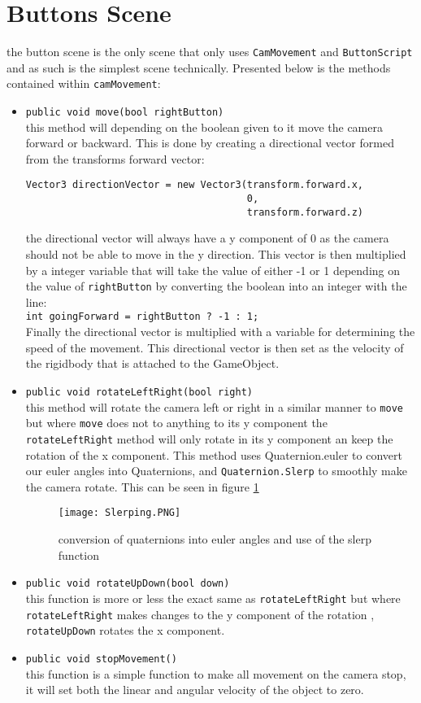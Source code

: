 \section{Buttons Scene}
the button scene is the only scene that only uses  {\tt CamMovement} and {\tt ButtonScript} and as such is the simplest scene technically. Presented below is  the methods contained within {\tt camMovement}: 
\begin{itemize}
\item {\tt public void move(bool rightButton)}\\
this method will depending on the boolean given to it move the camera forward or backward. This is done by creating a directional vector formed from the transforms forward vector:
\begin{verbatim}
Vector3 directionVector = new Vector3(transform.forward.x, 
                                      0,
                                      transform.forward.z)
\end{verbatim}
the directional vector will always have a y component of 0 as the camera should not be able to move in the y direction. This vector is then multiplied by a integer variable that will take the value of either -1 or 1 depending on the value of {\tt rightButton} by converting the boolean into an integer with the line:\\
{\tt int goingForward = rightButton ? -1 : 1;}\\
Finally the directional vector is multiplied with a variable for determining the speed of the movement. This directional vector is then set as the velocity of the rigidbody that is attached to the GameObject. 

\item {\tt public void rotateLeftRight(bool right)}\\
this method will rotate the camera left or right in a similar manner to {\tt move} but where {\tt move} does not to anything to its y component the {\tt rotateLeftRight} method will only rotate in its y component an keep the rotation of the x component. This method uses {Quaternion.euler } to convert our euler angles into Quaternions, and {\tt Quaternion.Slerp} to smoothly make the camera rotate. This can be seen in figure \ref{Slerping} 
\begin{figure}[H]
\centering
\texttt{[image: Slerping.PNG]}
\caption{conversion of quaternions into euler angles and use of the slerp function}
\label{Slerping}
\end{figure}
\item {\tt public void rotateUpDown(bool down)}\\
this function is more or less the exact same as {\tt rotateLeftRight} but where {\tt rotateLeftRight} makes changes to the y component of the rotation , {\tt rotateUpDown} rotates the x component. 

\item {\tt public void stopMovement()}\\
this function is a simple function to make all movement on the camera stop, it will set both the linear and angular velocity of the object to zero.
\end{itemize}


